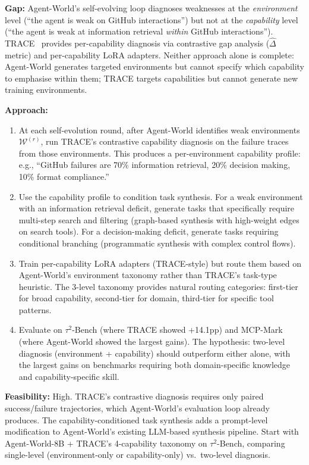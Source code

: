 \documentclass[11pt]{article}
\begin{document}
\textbf{Gap:} Agent-World's self-evolving loop diagnoses weaknesses at the \textit{environment} level (``the agent is weak on GitHub interactions'') but not at the \textit{capability} level (``the agent is weak at information retrieval \textit{within} GitHub interactions''). TRACE~\cite{trace} provides per-capability diagnosis via contrastive gap analysis ($\hat{\Delta}$ metric) and per-capability LoRA adapters. Neither approach alone is complete: Agent-World generates targeted environments but cannot specify which capability to emphasise within them; TRACE targets capabilities but cannot generate new training environments.

\textbf{Approach:}
\begin{enumerate}
    \item At each self-evolution round, after Agent-World identifies weak environments $\mathcal{W}^{(r)}$, run TRACE's contrastive capability diagnosis on the failure traces from those environments. This produces a per-environment capability profile: e.g., ``GitHub failures are 70\% information retrieval, 20\% decision making, 10\% format compliance.''

    \item Use the capability profile to condition task synthesis. For a weak environment with an information retrieval deficit, generate tasks that specifically require multi-step search and filtering (graph-based synthesis with high-weight edges on search tools). For a decision-making deficit, generate tasks requiring conditional branching (programmatic synthesis with complex control flows).

    \item Train per-capability LoRA adapters (TRACE-style) but route them based on Agent-World's environment taxonomy rather than TRACE's task-type heuristic. The 3-level taxonomy provides natural routing categories: first-tier for broad capability, second-tier for domain, third-tier for specific tool patterns.

    \item Evaluate on $\tau^2$-Bench (where TRACE showed +14.1pp) and MCP-Mark (where Agent-World showed the largest gains). The hypothesis: two-level diagnosis (environment + capability) should outperform either alone, with the largest gains on benchmarks requiring both domain-specific knowledge and capability-specific skill.
\end{enumerate}

\textbf{Feasibility:} High. TRACE's contrastive diagnosis requires only paired success/failure trajectories, which Agent-World's evaluation loop already produces. The capability-conditioned task synthesis adds a prompt-level modification to Agent-World's existing LLM-based synthesis pipeline. Start with Agent-World-8B + TRACE's 4-capability taxonomy on $\tau^2$-Bench, comparing single-level (environment-only or capability-only) vs.\ two-level diagnosis.
\end{document}
